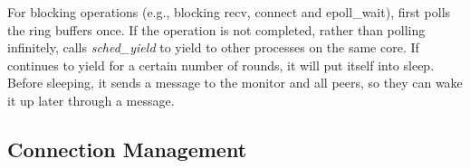 For blocking operations (e.g., blocking recv, connect and epoll\_wait), \libipc{} first polls the ring buffers once. If the operation is not completed, rather than polling infinitely, \libipc{} calls \textit{sched\_yield} to yield to other processes on the same core. %
If \libipc{} continues to yield for a certain number of rounds, it will put itself into sleep. Before sleeping, it sends a message to the monitor and all peers, so they can wake it up later through a message.




\subsection{Connection Management}
\label{subsec:connection-management}


